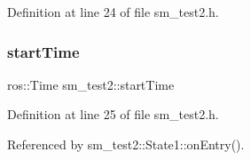 Definition at line 24 of file sm\+\_\+test2.\+h.

\mbox{\label{namespacesm__test2_a0b4e1ce52146b421cf6062a0900035aa}} 
\subsubsection{\texorpdfstring{start\+Time}{startTime}}
{\footnotesize\ttfamily ros\+::\+Time sm\+\_\+test2\+::start\+Time}



Definition at line 25 of file sm\+\_\+test2.\+h.



Referenced by sm\+\_\+test2\+::\+State1\+::on\+Entry().

